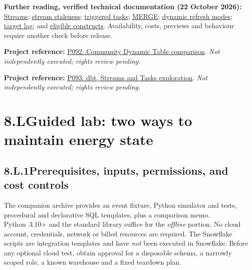 \documentclass[11pt,twoside]{article}
\newcommand{\topic}[2]{\subsection*{#1\quad #2}}
\newcommand{\repo}[2]{\par\begingroup\fontsize{8.0}{9.6}\selectfont\sffamily\color{inkgray}\textbf{Project reference:} \href{#2}{#1}. \textit{Not independently executed; rights review pending.}\par\endgroup}
\begin{document}
\textbf{Further reading, verified technical documentation (22 October 2026):} \href{https://docs.snowflake.com/en/user-guide/streams-intro}{Streams}; \href{https://docs.snowflake.com/en/user-guide/streams-manage}{stream staleness}; \href{https://docs.snowflake.com/en/user-guide/tasks-triggered}{triggered tasks}; \href{https://docs.snowflake.com/en/sql-reference/sql/merge}{MERGE}; \href{https://docs.snowflake.com/en/user-guide/dynamic-tables/refresh-modes}{dynamic refresh modes}; \href{https://docs.snowflake.com/en/user-guide/dynamic-tables-target-lag}{target lag}; and \href{https://docs.snowflake.com/en/user-guide/dynamic-tables/supported-queries}{eligible constructs}. Availability, costs, previews and behaviour require another check before release.
\repo{P092: Community Dynamic Table comparison}{https://github.com/subhamay-bhattacharyya/snowflake-dynamic-table-pipeline}
\repo{P093: dbt, Streams and Tasks exploration}{https://github.com/AidanHarveyNelson/dbt-streams-tasks}
\newpage
\section*{8.L\quad Guided lab: two ways to maintain energy state}
\topic{8.L.1}{Prerequisites, inputs, permissions, and cost controls}
The companion archive provides an event fixture, Python simulator and tests, procedural and declarative SQL templates, plus a comparison memo. Python~3.10+ and the standard library suffice for the \emph{offline} portion. No cloud account, credentials, network or billed resources are required. The Snowflake scripts are integration templates and have \emph{not} been executed in Snowflake. Before any optional cloud test, obtain approval for a disposable schema, a narrowly scoped role, a known warehouse and a fixed teardown plan.
\end{document}
